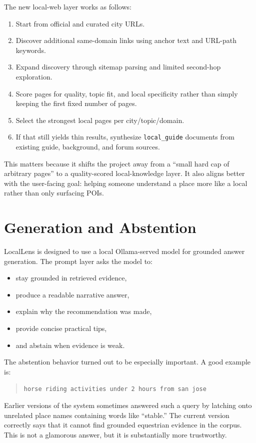 \documentclass[11pt]{article}
\begin{document}
The new local-web layer works as follows:
\begin{enumerate}[leftmargin=*]
    \item Start from official and curated city URLs.
    \item Discover additional same-domain links using anchor text and URL-path keywords.
    \item Expand discovery through sitemap parsing and limited second-hop exploration.
    \item Score pages for quality, topic fit, and local specificity rather than simply keeping the first fixed number of pages.
    \item Select the strongest local pages per city/topic/domain.
    \item If that still yields thin results, synthesize \texttt{local\_guide} documents from existing guide, background, and forum sources.
\end{enumerate}

This matters because it shifts the project away from a ``small hard cap of arbitrary pages'' to a quality-scored local-knowledge layer. It also aligns better with the user-facing goal: helping someone understand a place more like a local rather than only surfacing POIs.

\section{Generation and Abstention}
LocalLens is designed to use a local Ollama-served model for grounded answer generation. The prompt layer asks the model to:
\begin{itemize}[leftmargin=*]
    \item stay grounded in retrieved evidence,
    \item produce a readable narrative answer,
    \item explain why the recommendation was made,
    \item provide concise practical tips,
    \item and abstain when evidence is weak.
\end{itemize}

The abstention behavior turned out to be especially important. A good example is:
\begin{quote}
\texttt{horse riding activities under 2 hours from san jose}
\end{quote}
Earlier versions of the system sometimes answered such a query by latching onto unrelated place names containing words like ``stable.'' The current version correctly says that it cannot find grounded equestrian evidence in the corpus. This is not a glamorous answer, but it is substantially more trustworthy.
\end{document}
